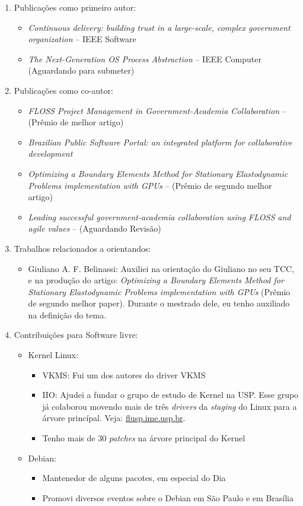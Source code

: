 \begin{enumerate}
  \item Publicações como primeiro autor:
    \begin{itemize}
      \item \emph{Continuous delivery: building trust in a large-scale, complex government organization} -- IEEE Software
      \item \emph{The Next-Generation OS Process Abstraction} -- IEEE Computer (Aguardando para submeter)
    \end{itemize}

  \item Publicações como co-autor:
    \begin{itemize}
      \item \emph{FLOSS Project Management in Government-Academia Collaboration} -- (Prêmio de melhor artigo)
      \item \emph{Brazilian Public Software Portal: an integrated platform for collaborative development}
      \item \emph{Optimizing a Boundary Elements Method for Stationary Elastodynamic Problems implementation with GPUs} -- (Prêmio de segundo melhor artigo)
      \item \emph{Leading successful government-academia collaboration using FLOSS and agile values} -- (Aguardando Revisão)
    \end{itemize}
  \item Trabalhos relacionados a orientandos:
    \begin{itemize}
      \item
Giuliano A. F. Belinassi: Auxiliei na orientação do Giuliano no seu TCC, e na
produção do artigo: \emph{Optimizing a Boundary Elements Method for Stationary
Elastodynamic Problems implementation with GPUs} (Prêmio de segundo melhor
paper). Durante o mestrado dele, eu tenho auxiliado na definição do tema.

    \end{itemize}
  \item Contribuições para Software livre:
    \begin{itemize}
      \item Kernel Linux:
        \begin{itemize}
          \item VKMS: Fui um dos autores do driver VKMS
          \item IIO: Ajudei a fundar o grupo de estudo de Kernel na USP. Esse grupo já colaborou movendo mais de três \emph{drivers} da \emph{staging} do Linux para a árvore princípal. Veja: \url{flusp.ime.usp.br}.
          \item Tenho mais de 30 \emph{patches} na árvore principal do Kernel
        \end{itemize}
      \item Debian:
        \begin{itemize}
          \item Mantenedor de alguns pacotes, em especial do Dia
          \item Promovi diversos eventos sobre o Debian em São Paulo e em Brasília
        \end{itemize}
    \end{itemize}


\end{enumerate}
